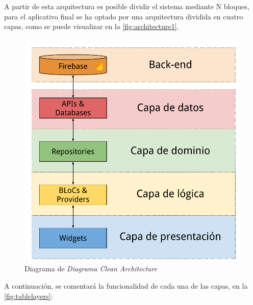 A partir de esta arquitectura es posible dividir el sistema mediante N bloques, para el aplicativo final se ha optado por una
arquitectura dividida en cuatro capas, como se puede visualizar en la \autoref{fig:architecture1}.

\begin{figure}[H]
  \centering
  \includegraphics[scale=0.7]{images/architecture.pdf}
  \caption{Diagrama de \textit{Diagrama Clean Architecture}}
  \label{fig:architecture1}
\end{figure}

A continuación, se comentará la funcionalidad de cada una de las capas, en la \autoref{fig:tablelayers}:

